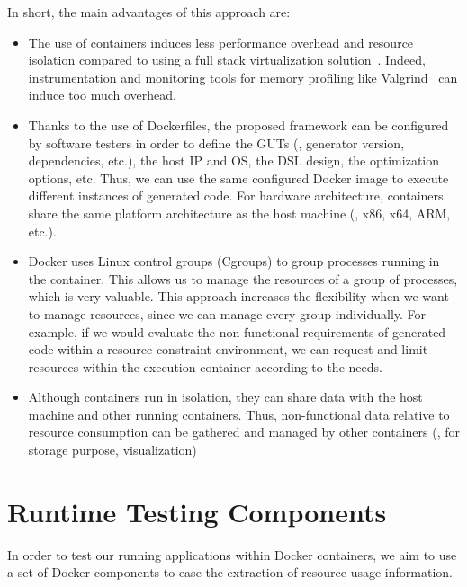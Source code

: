 In short, the main advantages of this approach are:
\begin{itemize}
	\item The use of containers induces less performance overhead and resource isolation compared to using a full stack virtualization solution~\cite{spoiala2016performance}. Indeed, instrumentation and monitoring tools for memory profiling like Valgrind~\cite{nethercote2007valgrind} can induce too much overhead.
	\item Thanks to the use of Dockerfiles, the proposed framework can be  configured by software testers in order to define the GUTs (\eg, generator version, dependencies, etc.), the host IP and OS, the DSL design, the optimization options, etc. Thus, we can use the same configured Docker image to execute different instances of generated code. For hardware architecture, containers share the same platform architecture as the host machine (\eg, x86, x64, ARM, etc.). 
	\item Docker uses Linux control groups (Cgroups) to group processes running in the container. This allows us to manage the resources of a group of processes, which is very valuable. 
	This approach increases the flexibility when we want to manage resources, since we can manage every group individually. For example, if we would evaluate the non-functional requirements of generated code within a resource-constraint environment, we can  request and limit resources within the execution container according to the needs.
	\item Although containers run in isolation, they can share data with the host machine and other running containers. Thus, non-functional data relative to resource consumption can be gathered and managed by other containers (\ie, for storage purpose, visualization)
\end{itemize}




\section{Runtime Testing Components}
In order to test our running applications within Docker containers, we aim to use a set of Docker components to ease the extraction of resource usage information.

